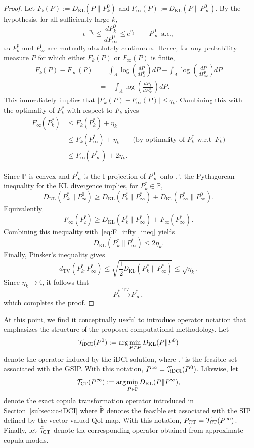 \documentclass{article}
\newcommand{\p}{\mathbb{P}}
\begin{document}
\begin{proof}
Let $F_k(P):=D_{\mathrm{KL}}(P\|P_k^0)$ and $F_\infty(P):=D_{\mathrm{KL}}(P\|P_\infty^0)$.
By the hypothesis, for all sufficiently large $k$,
\[
e^{-\eta_k}
\leq
\frac{dP_k^0}{dP_\infty^0}
\leq
e^{\eta_k}
\qquad
P_\infty^0\text{-a.e.},
\]
so $P_k^0$ and $P_\infty^0$ are mutually absolutely continuous.
Hence, for any probability
measure $P$ for which either $F_k(P)$ or $F_\infty(P)$ is finite,
\[
\begin{aligned}
F_k(P)-F_\infty(P)
&=
\int_\Lambda
\log\left(
\frac{dP}{dP_k^0}
\right)dP
-
\int_\Lambda
\log\left(
\frac{dP}{dP_\infty^0}
\right)dP \\
&=
-\int_\Lambda
\log\left(
\frac{dP_k^0}{dP_\infty^0}
\right)dP.
\end{aligned}
\]
This immediately implies that $\left|F_k(P)-F_\infty(P)\right|\leq \eta_k.$
Combining this with the optimality of $P_k^\ast$ with respect to $F_k$ gives
\begin{align}
F_\infty(P_k^\ast)
&\leq F_k(P_k^\ast)+\eta_k \nonumber \\
&\leq F_k(P_\infty^\ast)+\eta_k \qquad \text{(by optimality of $P_k^\ast$ w.r.t. $F_k$)}\nonumber \\
&\leq F_\infty(P_\infty^\ast)+2\eta_k \label{eq:F_infty_ineq}.
\end{align}

Since $\p$ is convex and $P_\infty^\ast$ is the I-projection of
$P_\infty^0$ onto $\p$, the Pythagorean inequality for the KL divergence
\cite{Csiszar1975} implies, for $P_k^\ast\in\p$,
\[
D_{\mathrm{KL}}(P_k^\ast\|P_\infty^0)
\geq
D_{\mathrm{KL}}(P_k^\ast\|P_\infty^\ast)
+
D_{\mathrm{KL}}(P_\infty^\ast\|P_\infty^0).
\]
Equivalently,
\[
F_\infty(P_k^\ast)
\geq
D_{\mathrm{KL}}(P_k^\ast\|P_\infty^\ast)
+
F_\infty(P_\infty^\ast).
\]
Combining this inequality with~\eqref{eq:F_infty_ineq} yields
\[
D_{\mathrm{KL}}(P_k^\ast\|P_\infty^\ast)
\leq 2\eta_k.
\]
Finally, Pinsker's inequality gives
\[
d_{\mathrm{TV}}(P_k^\ast,P_\infty^\ast)
\leq
\sqrt{
\frac{1}{2}
D_{\mathrm{KL}}(P_k^\ast\|P_\infty^\ast)
}
\leq
\sqrt{\eta_k}.
\]
Since $\eta_k\to0$, it follows that
\[
P_k^\ast
\xrightarrow{\mathrm{TV}}
P_\infty^\ast,
\]
which completes the proof.
\end{proof}

At this point, we find it conceptually useful to introduce operator notation that emphasizes the structure of the proposed computational methodology.
Let
\[
\mathcal T_{\rm iDCI}(P^0)
:=
\arg\min_{P\in\mathcal \p}
D_{\mathrm{KL}}(P\|P^0)
\]
denote the operator induced by the iDCI solution, where $\p$ is the feasible set associated with the GSIP.
With this notation, $P^\infty=\mathcal T_{\rm iDCI}(P^0)$.
Likewise, let
\[
\mathcal T_{\rm CT}(P^\infty)
:=
\arg\min_{P\in\widetilde{\p}}
D_{\mathrm{KL}}(P\|P^\infty),
\]
denote the exact copula transformation operator introduced in Section~\ref{subsec:cc-iDCI}  where $\widetilde{\p}$
denotes the feasible set associated with the SIP defined by the vector-valued QoI map.
With this notation, $P_{\rm CT}=\mathcal{T}_{\rm CT}(P^\infty)$.
Finally, let $\widehat{\mathcal T}_{\rm CT}$
denote the corresponding operator obtained from approximate copula models.
\end{document}
